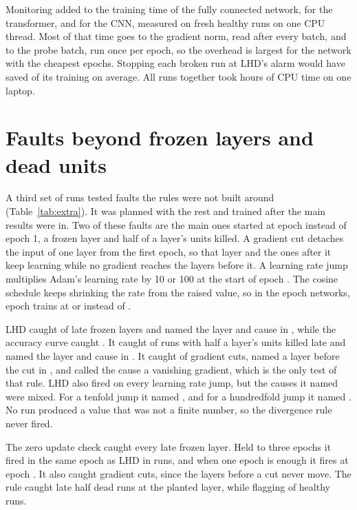 \documentclass[11pt]{article}
\begin{document}
Monitoring added \lhdMlpOverhead{} to the training time of the fully connected network, \lhdTransformerOverhead{} for the transformer, and \lhdCnnOverhead{} for the CNN, measured on fresh healthy runs on one CPU thread. Most of that time goes to the gradient norm, read after every batch, and to the probe batch, run once per epoch, so the overhead is largest for the network with the cheapest epochs. Stopping each broken run at LHD's alarm would have saved \lhdComputeSaved{} of its training on average. All runs together took \lhdTrainingHours{} hours of CPU time on one laptop.

\section{Faults beyond frozen layers and dead units}
\label{sec:extra}

A third set of runs tested faults the rules were not built around (Table~\ref{tab:extra}). It was planned with the rest and trained after the main results were in. Two of these faults are the main ones started at epoch \lhdLateOnset{} instead of epoch 1, a frozen layer and half of a layer's units killed. A gradient cut detaches the input of one layer from the first epoch, so that layer and the ones after it keep learning while no gradient reaches the layers before it. A learning rate jump multiplies Adam's learning rate by 10 or 100 at the start of epoch \lhdLateOnset{}. The cosine schedule keeps shrinking the rate from the raised value, so in the \lhdCnnEpochs{} epoch networks, epoch \lhdLateOnset{} trains at \lhdLrTimesTen{} or \lhdLrTimesHundred{} instead of \lhdLrNormal{}.

LHD caught \lhdLateFrozenCaught{} of \lhdLateFrozenRuns{} late frozen layers and named the layer and cause in \lhdLateFrozenBoth{}, while the accuracy curve caught \lhdLateFrozenAcc{}. It caught \lhdLateDeadCaught{} of \lhdLateDeadRuns{} runs with half a layer's units killed late and named the layer and cause in \lhdLateDeadBoth{}. It caught \lhdCutCaught{} of \lhdCutRuns{} gradient cuts, named a layer before the cut in \lhdCutBoth{}, and called the cause a vanishing gradient, which is the only test of that rule. LHD also fired on every learning rate jump, but the causes it named were mixed. For a tenfold jump it named \lhdLrTenCauses{}, and for a hundredfold jump it named \lhdLrHundredCauses{}. No run produced a value that was not a finite number, so the divergence rule never fired.

The zero update check caught every late frozen layer. Held to three epochs it fired in the same epoch as LHD in \lhdLateZeroTies{} runs, and when one epoch is enough it fires at epoch \lhdLateZeroEpoch{}. It also caught \lhdCutZero{} gradient cuts, since the layers before a cut never move. The \lhdSageThreshold{} rule caught \lhdLateDeadSage{} late half dead runs at the planted layer, while flagging \lhdSageFlagged{} of \lhdHealthyRuns{} healthy runs.
\end{document}
